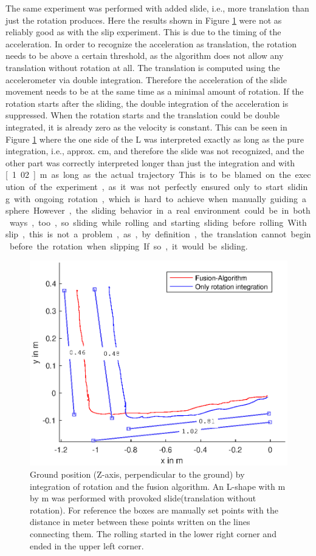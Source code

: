 \documentclass[letterpaper, 10 pt, conference]{ieeeconf}  %
\begin{document}
The same experiment was performed with added slide, i.e., more translation than just the rotation produces.
Here the results shown in Figure \ref{LTestSlide} were not as reliably good as with the slip experiment.
This is due to the timing of the acceleration. In order to recognize the acceleration as translation, the rotation needs to be above a certain threshold, as the algorithm does not allow any translation without rotation at all.
The translation is computed using the accelerometer via double integration.
Therefore the acceleration of the slide movement needs to be at the same time as a minimal amount of rotation. 
If the rotation starts after the sliding, the double integration of the acceleration is suppressed.
When the rotation starts and the translation could be double integrated, it is already zero as the velocity is constant.
This can be seen in Figure \ref{LTestSlide} where the one side of the L was interpreted exactly as long as the pure integration, i.e., approx. \unit[50]{cm}, and therefore the slide was not recognized, and the other part was correctly interpreted longer than just the integration and with \unit[1.02]{m} as long as the actual trajectory.
This is to be blamed on the execution of the experiment, as it was not perfectly ensured only to start sliding with ongoing rotation, which is hard to achieve when manually guiding a sphere.
However, the sliding behavior in a real environment could be in both ways, too, so sliding while rolling and starting sliding before rolling.
With slip, this is not a problem, as, by definition, the translation cannot begin before the rotation when slipping.
If so, it would be sliding.
\begin{figure}
\includegraphics[width=\linewidth]{./graphics/LTestSlide.eps}
\caption{Ground position (Z-axis, perpendicular to the ground) by integration of rotation and the fusion algorithm. An L-shape with \unit[1]{m} by \unit[1]{m} was performed with provoked slide(translation without rotation). For reference the boxes are manually set points with the distance in meter between these points written on the lines connecting them. The rolling started in the lower right corner and ended in the upper left corner.}
\label{LTestSlide}
\end{figure}
\end{document}
